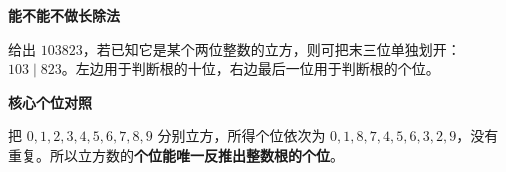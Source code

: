 \clearpage
\begin{statementbox}
\textbf{\textcolor{CStatement}{能不能不做长除法}}
\par\medskip
\begin{center}

\end{center}
\medskip
给出 $103823$，若已知它是某个两位整数的立方，则可把末三位单独划开：$103\mid823$。左边用于判断根的十位，右边最后一位用于判断根的个位。
\end{statementbox}
\clearpage
\begin{statementbox}
\textbf{\textcolor{CStatement}{核心个位对照}}
\par\medskip
\begin{center}

\end{center}
\medskip
把 $0,1,2,3,4,5,6,7,8,9$ 分别立方，所得个位依次为 $0,1,8,7,4,5,6,3,2,9$，没有重复。所以立方数的\textbf{个位能唯一反推出整数根的个位}。
\end{statementbox}
